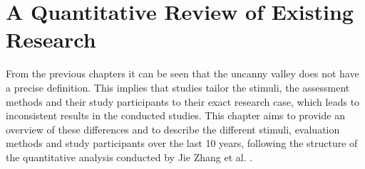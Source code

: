 \chapter{A Quantitative Review of Existing Research}
From the previous chapters it can be seen that the uncanny valley does not have a precise definition. This implies that studies tailor the stimuli, the assessment methods and their study participants to their exact research case, which leads to inconsistent results in the conducted studies. This chapter aims to provide an overview of these differences and to describe the different stimuli, evaluation methods and study participants over the last 10 years, following the structure of the quantitative analysis conducted by Jie Zhang et al. \cite{quant_review}.



